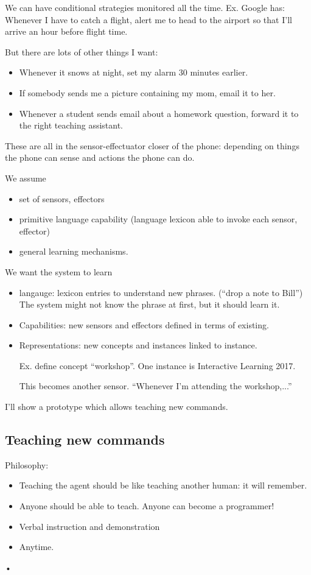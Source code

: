 We can have conditional strategies monitored all the time. Ex. Google has: Whenever I have to catch a flight, alert me to head to the airport so that I'll arrive an hour before flight time.

But there are lots of other things I want:
\begin{itemize}
\item
Whenever it snows at night, set my alarm 30 minutes earlier.
\item
If somebody sends me a picture containing my mom, email it to her.
\item
Whenever a student sends email about a homework question, forward it to the right teaching assistant.
\end{itemize}
These are all in the sensor-effectuator closer of the phone: depending on things the phone can sense and actions the phone can do.


We assume 
\begin{itemize}
\item
set of sensors, effectors
\item 
primitive language capability (language lexicon able to invoke each sensor, effector)
\item
general learning mechanisms.
\end{itemize}

We want the system to learn
\begin{itemize}
\item
langauge: lexicon entries to understand new phrases. (``drop a note to Bill'') The system might not know the phrase at first, but it should learn it.
\item
Capabilities: new sensors and effectors defined in terms of existing.
\item
Representations: new concepts and instances linked to instance. 

Ex. define concept ``workshop''. One instance is Interactive Learning 2017. 

This becomes another sensor. ``Whenever I'm attending the workshop,...''
\end{itemize}

I'll show a prototype which allows teaching new commands.
\subsection{Teaching new commands}
Philosophy:
\begin{itemize}
\item
Teaching the agent should be like teaching another human: it will remember.
\item
Anyone should be able to teach. Anyone can become a programmer!
\item
Verbal instruction and demonstration
\item
Anytime.
\end{itemize}•

